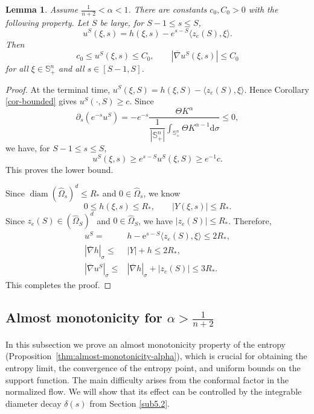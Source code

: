 \documentclass[11pt, reqno]{amsart}
\newtheorem{lemma}[theorem]{Lemma}
\theoremstyle{remark}
\theoremstyle{definition}
\numberwithin{equation}{section}
\DeclareMathOperator{\diam}{diam}
\newcommand{\Sph}{\mathbb S}
\begin{document}
\begin{lemma}
	\label{lem:unit-strip-transport-C0}
	Assume $\frac{1}{n+2} < \alpha <1$.  There are constants $c_0,C_0>0$ with the following property.  Let $S$ be large, for $S-1\le s\le S$,
	\begin{equation*}
		u^S(\xi,s)=h(\xi,s)-e^{s-S}\langle z_e(S), \xi \rangle.
	\end{equation*}
	Then
	\begin{equation*}
		c_0\le u^S(\xi,s)\le C_0,
		\qquad
		|\overline{\nabla} u^S(\xi,s)|\le C_0
	\end{equation*}
	for all $\xi\in\Sph^n_+$ and all $s\in[S-1,S]$.
\end{lemma}

\begin{proof}
	At the terminal time, $u^S(\xi,S)=h(\xi,S)-\langle z_e(S),\xi\rangle$.
	Hence Corollary \ref{cor-bounded} gives
	$u^S(\cdot,S)\ge c$. Since
	\begin{equation}
		\partial_s(e^{-s}u^S)
		=-e^{-s}\dfrac{\Theta K^{\alpha}}{\dfrac{1}{|\mathbb{S}_+^n|}\displaystyle\int_{\mathbb{S}_+^n}\Theta K^{\alpha-1}\mathrm{d}\sigma}\le0,
        \label{equ-uS}
	\end{equation}
	we have, for $S-1\le s\le S$,
	\begin{equation*}
		u^S(\xi,s)\ge e^{s-S}u^S(\xi,S)\ge e^{-1}c.
	\end{equation*}
	This proves the lower bound.

    Since $\diam{(\widehat{\Omega}_s)^d} \leq R_*$ and $0\in\widehat{\Omega}_s$, we know
    \begin{equation*}
        0 \leq h(\xi,s)\leq R_*,\qquad |Y(\xi,s)|\leq R_*.
    \end{equation*}
    Since $z_e(S)\in (\widehat{\Omega}_S)^d$ and $0\in\widehat{\Omega}_S$, we have $|z_e(S)|\leq R_*$. Therefore,
    \begin{align*}
        u^S = &h - \mathrm{e}^{s-S}\langle z_e(S),\xi \rangle \leq 2R_*,  \\
        |\overline{\nabla}h|_{\sigma} \leq & |Y|+h \leq 2R_*,\\
        |\overline{\nabla}u^S|_{\sigma} \leq & |\overline{\nabla}h|_{\sigma} + |z_e(S)| \leq 3R_*.
    \end{align*}
    This completes the proof.
\end{proof}

\subsection{Almost monotonicity for $\alpha>\frac{1}{n+2}$}
In this subsection we prove an almost monotonicity property of the entropy (Proposition~\ref{thm:almost-monotonicity-alpha}), which is crucial for obtaining the entropy limit, the convergence of the entropy point, and uniform bounds on the support function. The main difficulty arises from the conformal factor in the normalized flow. We will show that its effect can be controlled by the integrable diameter decay $\delta(s)$ from Section \ref{sub5.2}.
\end{document}
